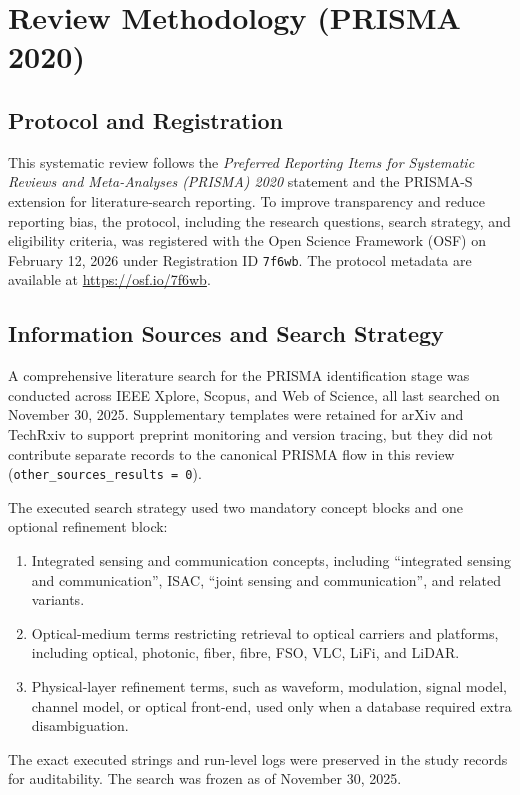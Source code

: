 \section{Review Methodology (PRISMA 2020)}
\label{sec:review-methodology}

\subsection{Protocol and Registration}
This systematic review follows the \textit{Preferred Reporting Items for Systematic Reviews and Meta-Analyses (PRISMA) 2020} statement and the PRISMA-S extension for literature-search reporting. To improve transparency and reduce reporting bias, the protocol, including the research questions, search strategy, and eligibility criteria, was registered with the Open Science Framework (OSF) on February 12, 2026 under Registration ID \texttt{7f6wb}. The protocol metadata are available at \url{https://osf.io/7f6wb}.

\subsection{Information Sources and Search Strategy}
A comprehensive literature search for the PRISMA identification stage was conducted across IEEE Xplore, Scopus, and Web of Science, all last searched on November 30, 2025. Supplementary templates were retained for arXiv and TechRxiv to support preprint monitoring and version tracing, but they did not contribute separate records to the canonical PRISMA flow in this review (\texttt{other\_sources\_results = 0}).

The executed search strategy used two mandatory concept blocks and one optional refinement block:
\begin{enumerate}
    \item Integrated sensing and communication concepts, including ``integrated sensing and communication'', ISAC, ``joint sensing and communication'', and related variants.
    \item Optical-medium terms restricting retrieval to optical carriers and platforms, including optical, photonic, fiber, fibre, FSO, VLC, LiFi, and LiDAR.
    \item Physical-layer refinement terms, such as waveform, modulation, signal model, channel model, or optical front-end, used only when a database required extra disambiguation.
\end{enumerate}

The exact executed strings and run-level logs were preserved in the study records for auditability. The search was frozen as of November 30, 2025.

